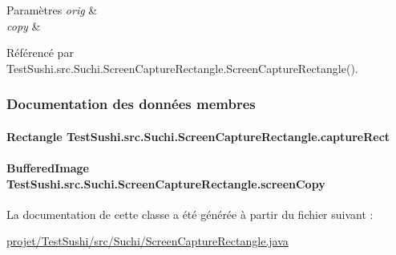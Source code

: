 \begin{DoxyParams}{Paramètres}
{\em orig} & \\
\hline
{\em copy} & \\
\hline
\end{DoxyParams}


Référencé par Test\+Sushi.\+src.\+Suchi.\+Screen\+Capture\+Rectangle.\+Screen\+Capture\+Rectangle().



\subsubsection{Documentation des données membres}
\hypertarget{classTestSushi_1_1src_1_1Suchi_1_1ScreenCaptureRectangle_ae512c58dc939eb6b5e9df4d74d84ec16}{}
\paragraph[{capture\+Rect}]{\setlength{\rightskip}{0pt plus 5cm}Rectangle Test\+Sushi.\+src.\+Suchi.\+Screen\+Capture\+Rectangle.\+capture\+Rect\hspace{0.3cm}{\ttfamily [package]}}\label{classTestSushi_1_1src_1_1Suchi_1_1ScreenCaptureRectangle_ae512c58dc939eb6b5e9df4d74d84ec16}
\hypertarget{classTestSushi_1_1src_1_1Suchi_1_1ScreenCaptureRectangle_aa53f5b7f13a25bf10729271c16bf04e9}{}
\paragraph[{screen\+Copy}]{\setlength{\rightskip}{0pt plus 5cm}Buffered\+Image Test\+Sushi.\+src.\+Suchi.\+Screen\+Capture\+Rectangle.\+screen\+Copy}\label{classTestSushi_1_1src_1_1Suchi_1_1ScreenCaptureRectangle_aa53f5b7f13a25bf10729271c16bf04e9}


La documentation de cette classe a été générée à partir du fichier suivant \+:\begin{DoxyCompactItemize}
\item 
\hyperlink{projet_2TestSushi_2src_2Suchi_2ScreenCaptureRectangle_8java}{projet/\+Test\+Sushi/src/\+Suchi/\+Screen\+Capture\+Rectangle.\+java}\end{DoxyCompactItemize}
